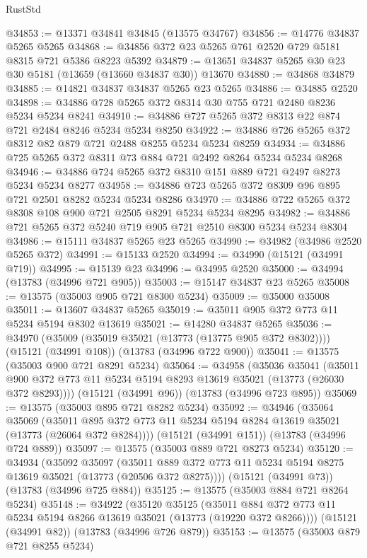 \begin{lexlean}{RustStd}
\begin{coremodule}
@34853 := @13371 @34841 @34845 (@13575 @34767)
@34856 := @14776 @34837 @5265 @5265
@34868 := @34856 @372 @23 @5265 @761 @2520 @729 @5181 @8315 @721 @5386 @8223 @5392
@34879 := @13651 @34837 @5265 @30 @23 @30 @5181 (@13659 (@13660 @34837 @30)) @13670
@34880 := @34868 @34879
@34885 := @14821 @34837 @34837 @5265 @23 @5265
@34886 := @34885 @2520
@34898 := @34886 @728 @5265 @372 @8314 @30 @755 @721 @2480 @8236 @5234 @5234 @8241
@34910 := @34886 @727 @5265 @372 @8313 @22 @874 @721 @2484 @8246 @5234 @5234 @8250
@34922 := @34886 @726 @5265 @372 @8312 @82 @879 @721 @2488 @8255 @5234 @5234 @8259
@34934 := @34886 @725 @5265 @372 @8311 @73 @884 @721 @2492 @8264 @5234 @5234 @8268
@34946 := @34886 @724 @5265 @372 @8310 @151 @889 @721 @2497 @8273 @5234 @5234 @8277
@34958 := @34886 @723 @5265 @372 @8309 @96 @895 @721 @2501 @8282 @5234 @5234 @8286
@34970 := @34886 @722 @5265 @372 @8308 @108 @900 @721 @2505 @8291 @5234 @5234 @8295
@34982 := @34886 @721 @5265 @372 @5240 @719 @905 @721 @2510 @8300 @5234 @5234 @8304
@34986 := @15111 @34837 @5265 @23 @5265
@34990 := @34982 (@34986 @2520 @5265 @372)
@34991 := @15133 @2520
@34994 := @34990 (@15121 (@34991 @719))
@34995 := @15139 @23
@34996 := @34995 @2520
@35000 := @34994 (@13783 (@34996 @721 @905))
@35003 := @15147 @34837 @23 @5265
@35008 := @13575 (@35003 @905 @721 @8300 @5234)
@35009 := @35000 @35008
@35011 := @13607 @34837 @5265
@35019 := @35011 @905 @372 @773 @11 @5234 @5194 @8302 @13619
@35021 := @14280 @34837 @5265
@35036 := @34970
    (@35009 (@35019 @35021 (@13773 (@13775 @905 @372 @8302))))
    (@15121 (@34991 @108))
    (@13783 (@34996 @722 @900))
@35041 := @13575 (@35003 @900 @721 @8291 @5234)
@35064 := @34958
    (@35036
      @35041
      (@35011 @900 @372 @773 @11 @5234 @5194 @8293 @13619 @35021 (@13773 (@26030 @372 @8293))))
    (@15121 (@34991 @96))
    (@13783 (@34996 @723 @895))
@35069 := @13575 (@35003 @895 @721 @8282 @5234)
@35092 := @34946
    (@35064
      @35069
      (@35011 @895 @372 @773 @11 @5234 @5194 @8284 @13619 @35021 (@13773 (@26064 @372 @8284))))
    (@15121 (@34991 @151))
    (@13783 (@34996 @724 @889))
@35097 := @13575 (@35003 @889 @721 @8273 @5234)
@35120 := @34934
    (@35092
      @35097
      (@35011 @889 @372 @773 @11 @5234 @5194 @8275 @13619 @35021 (@13773 (@20506 @372 @8275))))
    (@15121 (@34991 @73))
    (@13783 (@34996 @725 @884))
@35125 := @13575 (@35003 @884 @721 @8264 @5234)
@35148 := @34922
    (@35120
      @35125
      (@35011 @884 @372 @773 @11 @5234 @5194 @8266 @13619 @35021 (@13773 (@19220 @372 @8266))))
    (@15121 (@34991 @82))
    (@13783 (@34996 @726 @879))
@35153 := @13575 (@35003 @879 @721 @8255 @5234)

\end{coremodule}
\end{lexlean}
